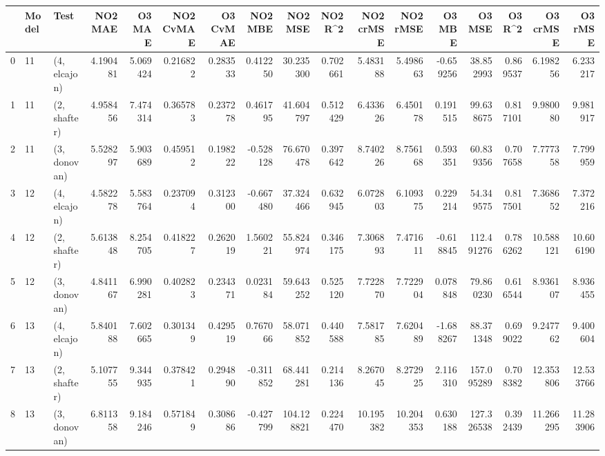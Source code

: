 \begin{tabular}{lllrrrrrrrrrrrrrr}
\toprule
{} & Model &          Test &    NO2 MAE &     O3 MAE &  NO2 CvMAE &  O3 CvMAE &   NO2 MBE &     NO2 MSE &   NO2 R\textasciicircum2 &  NO2 crMSE &   NO2 rMSE &     O3 MBE &      O3 MSE &    O3 R\textasciicircum2 &   O3 crMSE &    O3 rMSE \\
\midrule
0  &    11 &  (4, elcajon) &   4.190481 &   5.069424 &   0.216822 &  0.283533 &  0.412250 &   30.235300 &  0.702661 &   5.483188 &   5.498663 &  -0.659256 &   38.852993 &  0.869537 &   6.198256 &   6.233217 \\
1  &    11 &  (2, shafter) &   4.958456 &   7.474314 &   0.365783 &  0.237278 &  0.461795 &   41.604797 &  0.512429 &   6.433626 &   6.450178 &   0.191515 &   99.638675 &  0.817101 &   9.980080 &   9.981917 \\
2  &    11 &  (3, donovan) &   5.528297 &   5.903689 &   0.459512 &  0.198222 & -0.528128 &   76.670478 &  0.397642 &   8.740226 &   8.756168 &   0.593351 &   60.839356 &  0.707658 &   7.777358 &   7.799959 \\
3  &    12 &  (4, elcajon) &   4.582278 &   5.583764 &   0.237094 &  0.312300 & -0.667480 &   37.324466 &  0.632945 &   6.072803 &   6.109375 &   0.229214 &   54.349575 &  0.817501 &   7.368652 &   7.372216 \\
4  &    12 &  (2, shafter) &   5.613848 &   8.254705 &   0.418227 &  0.262019 &  1.560221 &   55.824974 &  0.346175 &   7.306893 &   7.471611 &  -0.618845 &  112.491276 &  0.786262 &  10.588121 &  10.606190 \\
5  &    12 &  (3, donovan) &   4.841167 &   6.990281 &   0.402823 &  0.234371 &  0.023184 &   59.643252 &  0.525120 &   7.722870 &   7.722904 &   0.078848 &   79.860230 &  0.616544 &   8.936107 &   8.936455 \\
6  &    13 &  (4, elcajon) &   5.840188 &   7.602665 &   0.301349 &  0.429519 &  0.767066 &   58.071852 &  0.440588 &   7.581785 &   7.620489 &  -1.688267 &   88.371348 &  0.699022 &   9.247762 &   9.400604 \\
7  &    13 &  (2, shafter) &   5.107755 &   9.344935 &   0.378421 &  0.294890 & -0.311852 &   68.441281 &  0.214136 &   8.267045 &   8.272925 &   2.116310 &  157.095289 &  0.708382 &  12.353806 &  12.533766 \\
8  &    13 &  (3, donovan) &   6.811358 &   9.184246 &   0.571849 &  0.308686 & -0.427799 &  104.128821 &  0.224470 &  10.195382 &  10.204353 &   0.630188 &  127.326538 &  0.392439 &  11.266295 &  11.283906 \\

\end{tabular}
